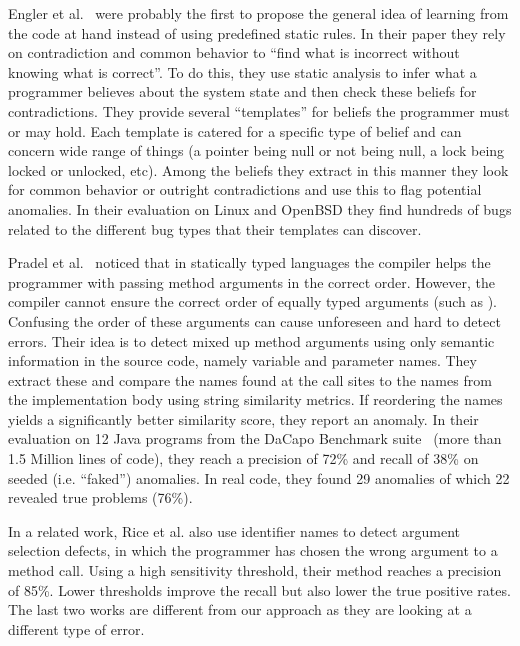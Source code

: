 Engler et al.~\cite{engler2001bugs} were probably the first to propose the general idea of learning from the code at hand instead of using predefined static rules.
In their paper they rely on contradiction and common behavior to ``find what is incorrect without knowing what is correct''.
To do this, they use static analysis to infer what a programmer believes about the system state and then check these beliefs for contradictions.
They provide several ``templates'' for beliefs the programmer must or may hold.
Each template is catered for a specific type of belief and can concern wide range of things (a pointer being null or not being null, a lock being locked or unlocked, etc).
Among the beliefs they extract in this manner they look for common behavior or outright contradictions and use this to flag potential anomalies.
In their evaluation on Linux and OpenBSD they find hundreds of bugs related to the different bug types that their templates can discover.

Pradel et al.~\cite{pradel2011detecting} noticed that in statically typed languages the compiler helps the programmer with passing method arguments in the correct order.
However, the compiler cannot ensure the correct order of equally typed arguments (such as ).
Confusing the order of these arguments can cause unforeseen and hard to detect errors.
Their idea is to detect mixed up method arguments using only semantic information in the source code, namely variable and parameter names.
They extract these and compare the names found at the call sites to the names from the implementation body using string similarity metrics. 
If reordering the names yields a significantly better similarity score, they report an anomaly.
In their evaluation on 12 Java programs from the DaCapo Benchmark suite~\cite{blackburn2006dacapo} (more than 1.5 Million lines of code), they reach a precision of 72\% and recall of 38\% on seeded (i.e. ``faked'') anomalies.
In real code, they found 29 anomalies of which 22 revealed true problems (76\%).

In a related work, Rice et al. \cite{rice2017detecting} also use identifier names to detect argument selection defects, in which the programmer has chosen the wrong argument to a method call.
Using a high sensitivity threshold, their method reaches a precision of 85\%. Lower thresholds improve the recall but also lower the true positive rates.
The last two works are different from our approach as they are looking at a different type of error.

